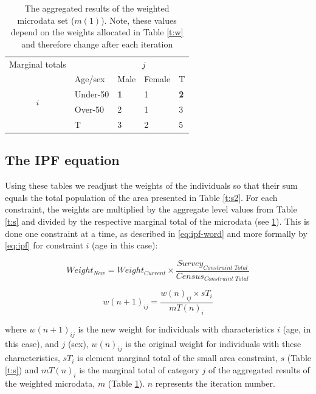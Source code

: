 \documentclass[a4paper, 11pt, twoside]{article}
\begin{document}
\begin{table}[htbp]
\centering
\caption[The aggregated results of the weighted
microdata set]{The aggregated results of the weighted
microdata set ($m(1)$).
Note, these values depend on the
weights allocated in Table \ref{t:w} and therefore
 change after each iteration}

\begin{tabular}{cllll}\toprule
Marginal totals&  & \multicolumn{2}{c}{$j$} & \\
& Age/sex & Male & Female & T\\ \midrule
\multirow{2}{*}{$i$} & Under-50 & \textbf{1} & 1 & \textbf{2}\\
& Over-50 & 2 & 1 &3 \\
& T & 3 & 2 &5\\
\bottomrule
\end{tabular}
\label{t:m}
\end{table}

\subsection{The IPF equation} \label{ipfeq}


Using these tables we readjust the weights of the
individuals so that their sum equals the total population of the area presented
in Table \ref{t:s2}.
For each constraint, the weights are multiplied
by the aggregate level values from Table \ref{t:s} and divided by the
respective marginal total of the microdata (see \cref{t:m}).
This is done one constraint at a time, as described in
\cref{eq:ipf-word} and more formally by
\cref{eq:ipf} for constraint $i$ (age in this case):

\begin{equation}
  Weight_{New} = Weight_{Current} \times \frac{Survey_{Constraint \; Total}}{Census_{Constraint \; Total}}
\label{eq:ipf-word}
\end{equation}



\begin{equation}
w(n+1)_{ij} = \frac{w(n)_{ij} \times sT_{i}}{mT(n)_{i}}
\label{eq:ipf}
\end{equation}



where $w(n+1)_{ij}$ is the new weight for individuals with characteristics $i$
(age, in this case), and $j$ (sex),  $w(n)_{ij}$ is the original
weight for individuals with these characteristics, $sT_{i}$ is element
marginal total of the small area constraint, $s$
(Table \ref{t:s}) and $mT(n)_{i}$ is the marginal total of category
$j$ of the aggregated results of the weighted
microdata, $m$ (Table \ref{t:m}).
$n$ represents the iteration number.
\end{document}
